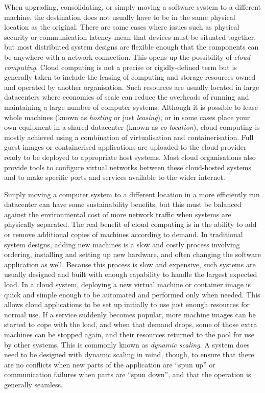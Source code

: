 When upgrading, consolidating, or simply moving a software system to a different machine, the destination does not usually have to be in the same physical location as the original. There are some cases where issues such as physical security or communication latency mean that devices must be situated together, but most distributed system designs are flexible enough that the components can be anywhere with a network connection. This opens up the possibility of \emph{\gls{cloud computing}}. Cloud computing is not a precise or rigidly-defined term but is generally taken to include the leasing of computing and storage resources owned and operated by another organisation. Such resources are usually located in large \gls{datacenter}s where economies of scale can reduce the overheads of running and maintaining a large number of computer systems. Although it is possible to lease whole machines (known as \emph{hosting} or just \emph{leasing}), or in some cases place your own equipment in a shared datacenter (known as \emph{co-location}), cloud computing is mostly achieved using a combination of \gls{virtualisation} and \gls{containerisation}. Full guest images or containerised applications are uploaded to the cloud provider ready to be deployed to appropriate host systems. Most cloud organisations also provide tools to configure virtual networks between these cloud-hosted systems and to make specific ports and services available to the wider internet.

Simply moving a computer system to a different location in a more efficiently run datacenter can have some sustainability benefits, but this must be balanced against the environmental cost of more network traffic when systems are physically separated. The real benefit of cloud computing is in the ability to add or remove additional copies of machines according to demand. In traditional system designs, adding new machines is a slow and costly process involving ordering, installing and setting up new hardware, and often changing the software application as well. Because this process is slow and expensive, such systems are usually designed and built with enough capability to handle the largest expected load. In a cloud system, deploying a new virtual machine or container image is quick and simple enough to be automated and performed only when needed. This allows cloud applications to be set up initially to use just enough resources for normal use. If a service suddenly becomes popular, more machine images can be started to cope with the load, and when that demand drops, some of those extra machines can be stopped again, and their resources returned to the pool for use by other systems. This is commonly known as \emph{\gls{dynamic scaling}}. A system does need to be designed with dynamic scaling in mind, though, to ensure that there are no conflicts when new parts of the application are \enquote{spun up} or communication failures when parts are \enquote{spun down}, and that the operation is generally seamless.

